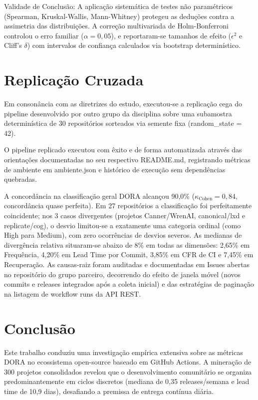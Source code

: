 \documentclass[12pt]{article}
\begin{document}
Validade de Conclusão: A aplicação sistemática de testes não paramétricos (Spearman, Kruskal-Wallis, Mann-Whitney) protegeu as deduções contra a assimetria das distribuições. A correção multivariada de Holm-Bonferroni controlou o erro familiar ($\alpha = 0{,}05$), e reportaram-se tamanhos de efeito ($\epsilon^2$ e Cliff's $\delta$) com intervalos de confiança calculados via bootstrap determinístico.

\section{Replicação Cruzada}
\label{sec:replicacao}

Em consonância com as diretrizes do estudo, executou-se a replicação cega do pipeline desenvolvido por outro grupo da disciplina sobre uma subamostra determinística de 30 repositórios sorteados via semente fixa (random\_state = 42).

O pipeline replicado executou com êxito e de forma automatizada através das orientações documentadas no seu respectivo README.md, registrando métricas de ambiente em ambiente.json e histórico de execução sem dependências quebradas.

A concordância na classificação geral DORA alcançou 90,0\% ($\kappa_{\text{Cohen}} = 0{,}84$, concordância quase perfeita). Em 27 repositórios a classificação foi perfeitamente coincidente; nos 3 casos divergentes (projetos Canner/WrenAI, canonical/lxd e replicate/cog), o desvio limitou-se a exatamente uma categoria ordinal (como High para Medium), com zero ocorrências de desvios severos. As medianas de divergência relativa situaram-se abaixo de $8\%$ em todas as dimensões: 2,65\% em Frequência, 4,20\% em Lead Time por Commit, 3,85\% em CFR de CI e 7,45\% em Recuperação. As causas-raiz foram auditadas e documentadas em Issues abertas no repositório do grupo parceiro, decorrendo do efeito de janela móvel (novos commits e releases integrados após a coleta inicial) e das estratégias de paginação na listagem de workflow runs da API REST.

\section{Conclusão}
\label{sec:conclusao}

Este trabalho conduziu uma investigação empírica extensiva sobre as métricas DORA no ecossistema open-source baseado em GitHub Actions. A mineração de 300 projetos consolidados revelou que o desenvolvimento comunitário se organiza predominantemente em ciclos discretos (mediana de 0,35 releases/semana e lead time de 10,9 dias), desafiando a premissa de entrega contínua diária.
\end{document}
